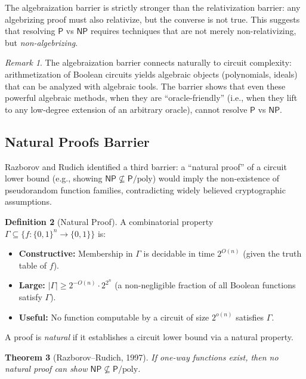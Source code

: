 \documentclass[11pt,a4paper]{article}
\theoremstyle{plain}
\newtheorem{theorem}{Theorem}[section]
\theoremstyle{definition}
\newtheorem{definition}[theorem]{Definition}
\theoremstyle{remark}
\newtheorem{remark}[theorem]{Remark}
\newcommand{\PP}{\mathsf{P}}
\newcommand{\NP}{\mathsf{NP}}
\newcommand{\poly}{\mathrm{poly}}
\begin{document}
The algebraization barrier is strictly stronger than the relativization barrier:
any algebrizing proof must also relativize, but the converse is not true.  This
suggests that resolving $\PP$ vs $\NP$ requires techniques that are not merely
non-relativizing, but \emph{non-algebrizing}.

\begin{remark}
The algebraization barrier connects naturally to circuit complexity:
arithmetization of Boolean circuits yields algebraic objects (polynomials,
ideals) that can be analyzed with algebraic tools.  The barrier shows that even
these powerful algebraic methods, when they are ``oracle-friendly'' (i.e., when
they lift to any low-degree extension of an arbitrary oracle), cannot resolve
$\PP$ vs $\NP$.
\end{remark}

\subsection{Natural Proofs Barrier}

Razborov and Rudich \cite{RR97} identified a third barrier: a ``natural proof''
of a circuit lower bound (e.g., showing $\NP \not\subseteq \PP/\poly$) would
imply the non-existence of pseudorandom function families, contradicting widely
believed cryptographic assumptions.

\begin{definition}[Natural Proof]
A combinatorial property $\Gamma \subseteq \{f : \{0,1\}^n \to \{0,1\}\}$ is:
\begin{itemize}
    \item \textbf{Constructive:} Membership in $\Gamma$ is decidable in time
    $2^{O(n)}$ (given the truth table of $f$).
    \item \textbf{Large:} $|\Gamma| \geq 2^{-O(n)} \cdot 2^{2^n}$ (a non-negligible
    fraction of all Boolean functions satisfy $\Gamma$).
    \item \textbf{Useful:} No function computable by a circuit of size $2^{o(n)}$
    satisfies $\Gamma$.
\end{itemize}
A proof is \emph{natural} if it establishes a circuit lower bound via a natural
property.
\end{definition}

\begin{theorem}[Razborov--Rudich, 1997]
If one-way functions exist, then no natural proof can show
$\NP \not\subseteq \PP/\poly$.
\end{theorem}
\end{document}
